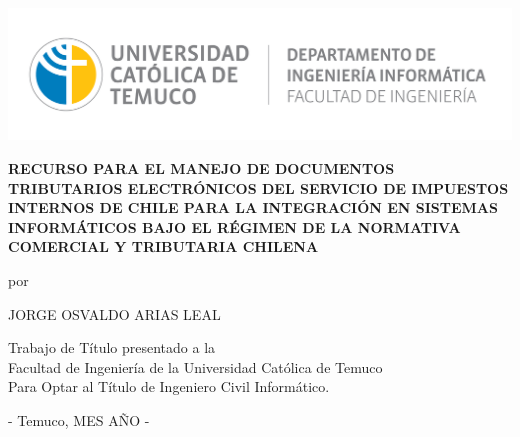 \vspace*{-6\baselineskip}
\hspace*{-0.0\textwidth}\includegraphics[width=\textwidth]{images/Logo_depto_ing_informatica.png}\nonumber

\vspace{3cm}

\begin{center}
    \textbf{ RECURSO PARA EL MANEJO DE DOCUMENTOS TRIBUTARIOS ELECTRÓNICOS DEL SERVICIO DE IMPUESTOS INTERNOS DE CHILE PARA LA INTEGRACIÓN EN SISTEMAS INFORMÁTICOS BAJO EL RÉGIMEN DE LA NORMATIVA COMERCIAL Y TRIBUTARIA CHILENA}
\end{center}
\vspace{3.5cm}

\begin{center}
por
\par\end{center}

\begin{center}
JORGE OSVALDO ARIAS LEAL\vspace{3cm}
\par\end{center}

\begin{center}
Trabajo de Título presentado a la\\
Facultad de Ingeniería de la Universidad Católica de Temuco\\
Para Optar al Título de Ingeniero Civil Informático.
\par\end{center}
\begin{center}
- Temuco, MES AÑO -
\par\end{center}

